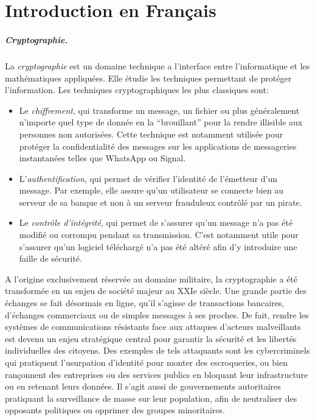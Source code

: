 
\chapter{Introduction en Français}

\paragraph{Cryptographie.} La \textit{cryptographie} est un domaine technique a l'interface entre l'informatique et les mathématiques appliquées. Elle étudie les techniques permettant de protéger l'information. Les techniques cryptographiques les plus classiques sont:
\begin{itemize}
	\item Le \textit{chiffrement}, qui transforme un message, un fichier ou plus généralement n'importe quel type de donnée en la ``brouillant'' pour la rendre illisible aux personnes non autorisées. Cette technique est notamment utilisée pour protéger la confidentialité des messages sur les applications de messageries instantanées telles que WhatsApp ou Signal.
	\item L'\textit{authentification}, qui permet de vérifier l'identité de l'émetteur d'un message. Par exemple, elle assure qu’un utilisateur se connecte bien au serveur de sa banque et non à un serveur frauduleux contrôlé par un pirate.
	\item Le \textit{contrôle d'intégrité}, qui permet de s'assurer qu'un message n'a pas été modifié ou corrompu pendant sa transmission. C'est notamment utile pour s'assurer qu'un logiciel téléchargé n'a pas été altéré afin d'y introduire une faille de sécurité.
\end{itemize}


A l'origine exclusivement réservée au domaine militaire, la cryptographie a été transformée en un enjeu de société majeur au XXIe siècle. Une grande partie des échanges se fait désormais en ligne, qu'il s'agisse de transactions bancaires, d'échanges commerciaux ou de simples messages à ses proches. De fait, rendre les systèmes de communications résistants face aux attaques d'acteurs malveillants est devenu  un enjeu stratégique central pour garantir la sécurité et les libertés individuelles des citoyens. Des exemples de tels attaquants sont les cybercriminels qui pratiquent l'usurpation d'identité pour monter des escroqueries, ou bien rançonnent des entreprises ou des services publics en bloquant leur infrastructure ou en retenant leurs données. Il s'agit aussi de gouvernements autoritaires pratiquant la surveillance de masse sur leur population, afin de neutraliser des opposants politiques ou opprimer des groupes minoritaires.

